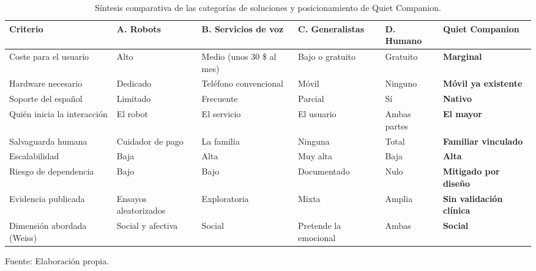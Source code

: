 \begin{table}
    \centering
    \caption{Síntesis comparativa de las categorías de soluciones y posicionamiento de Quiet Companion.}
    \label{tab:sintesis-comparativa}
    \footnotesize
    \begin{tabularx}{\textheight}{@{}l *{4}{>{\RaggedRight\arraybackslash}X} >{\RaggedRight\arraybackslash\bfseries}X@{}}
        \toprule
        \textbf{Criterio} & \textbf{A. Robots} & \textbf{B. Servicios de voz} & \textbf{C. Generalistas} & \textbf{D. Humano} & \textbf{Quiet Companion} \\
        \midrule
        Coste para el usuario       & Alto              & Medio (unos 30 \$ al mes) & Bajo o gratuito        & Gratuito             & Marginal \\
        Hardware necesario          & Dedicado          & Teléfono convencional     & Móvil                  & Ninguno              & Móvil ya existente \\
        Soporte del español         & Limitado          & Frecuente                 & Parcial                & Sí                   & Nativo \\
        Quién inicia la interacción & El robot          & El servicio               & El usuario             & Ambas partes         & El mayor \\
        Salvaguarda humana          & Cuidador de pago  & La familia                & Ninguna                & Total                & Familiar vinculado \\
        Escalabilidad               & Baja              & Alta                      & Muy alta               & Baja                 & Alta \\
        Riesgo de dependencia       & Bajo              & Bajo                      & Documentado            & Nulo                 & Mitigado por diseño \\
        Evidencia publicada         & Ensayos aleatorizados & Exploratoria          & Mixta                  & Amplia               & Sin validación clínica \\
        Dimensión abordada (Weiss)  & Social y afectiva & Social                    & Pretende la emocional  & Ambas                & Social \\
        \bottomrule
    \end{tabularx}

    \vspace{2pt}
    {\footnotesize Fuente: Elaboración propia.}
\end{table}
